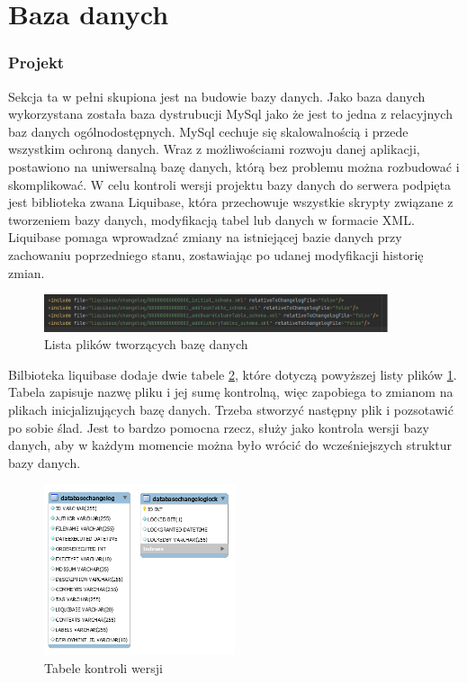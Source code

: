 \section{Baza danych}

\subsubsection{Projekt}
Sekcja ta w pełni skupiona jest na budowie bazy danych. Jako baza danych wykorzystana została baza dystrubucji MySql jako że jest to jedna z relacyjnych baz danych ogólnodostępnych. MySql cechuje się skalowalnością i przede wszystkim ochroną danych. Wraz z możliwościami rozwoju danej aplikacji, postawiono na uniwersalną bazę danych, którą bez problemu można rozbudować i skomplikować.
W celu kontroli wersji projektu bazy danych do serwera podpięta jest biblioteka zwana Liquibase, która przechowuje wszystkie skrypty związane z tworzeniem bazy danych, modyfikacją tabel lub danych w formacie XML. Liquibase pomaga wprowadzać zmiany na istniejącej bazie danych przy zachowaniu poprzedniego stanu, zostawiając po udanej modyfikacji historię zmian. 
\begin{figure}[h]
	\centering
	\includegraphics[width=0.90\textwidth]{liqubase}		
	\caption{Lista plików tworzących bazę danych }
	\label{listaplikow}
\end{figure}
Bilbioteka liquibase dodaje dwie tabele \ref{liqutable}, które dotyczą powyższej listy plików \ref{listaplikow}. Tabela zapisuje nazwę pliku i jej sumę kontrolną, więc zapobiega to zmianom na plikach inicjalizujących bazę danych. Trzeba stworzyć następny plik i pozsotawić po sobie ślad. Jest to bardzo pomocna rzecz, służy jako kontrola wersji bazy danych, aby w każdym momencie można było wrócić do wcześniejszych struktur bazy danych.
\begin{figure}[h]
	\centering
	\includegraphics[width=0.50\textwidth]{liquibasetables}
	\caption{ Tabele kontroli wersji}
	\label{liqutable}
\end{figure}
